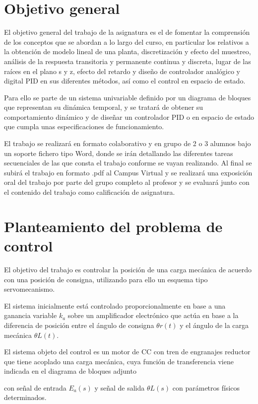 \section{Objetivo general}
El objetivo general del trabajo de la asignatura es el de fomentar la
comprensión de los conceptos que se abordan a lo largo del curso, en
particular los relativos a la obtención de modelo lineal de una
planta, discretización y efecto del muestreo, análisis de la respuesta
transitoria y permanente continua y discreta, lugar de las raíces en
el plano s y z, efecto del retardo y diseño de controlador analógico y
digital PID en sus diferentes métodos, así como el control en espacio
de estado.

Para ello se parte de un sistema univariable definido por un diagrama
de bloques que representan su dinámica temporal, y se tratará de
obtener su comportamiento dinámico y de diseñar un controlador PID o
en espacio de estado que cumpla unas especificaciones de
funcionamiento.

El trabajo se realizará en formato colaborativo y en grupo de 2 o 3
alumnos bajo un soporte fichero tipo Word, donde se irán detallando
las diferentes tareas secuenciales de las que consta el trabajo
conforme se vayan realizando. Al final se subirá el trabajo en formato
.pdf al Campus Virtual y se realizará una exposición oral del trabajo
por parte del grupo completo al profesor y se evaluará junto con el
contenido del trabajo como calificación de asignatura.

\section{Planteamiento del problema de control}
El objetivo del trabajo es controlar la posición de una carga mecánica
de acuerdo con una posición de consigna, utilizando para ello un
esquema tipo servomecanismo.

El sistema inicialmente está controlado proporcionalmente en base a
una ganancia variable $k_a$ sobre un amplificador electrónico que actúa
en base a la diferencia de posición entre el ángulo de consigna
$\theta r(t)$ y el ángulo de la carga mecánica $\theta L(t)$.

El sistema objeto del control es un motor de CC con tren de engranajes
reductor que tiene acoplado una carga mecánica, cuya función de
transferencia viene indicada en el diagrama de bloques adjunto

con señal de entrada $E_a(s)$ y señal de salida $\theta L(s)$ con
parámetros físicos determinados.

